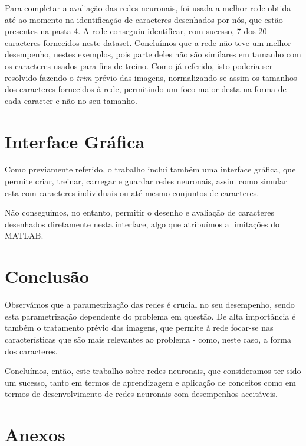 \documentclass[11pt]{article}
\begin{document}
	Para completar a avaliação das redes neuronais, foi usada a melhor rede obtida até ao momento na identificação de caracteres desenhados por nós, que estão presentes na pasta 4. A rede conseguiu identificar, com sucesso, 7 dos 20 caracteres fornecidos neste dataset. Concluímos que a rede não teve um melhor desempenho, nestes exemplos, pois parte deles não são similares em tamanho com os caracteres usados para fins de treino. Como já referido, isto poderia ser resolvido fazendo o \textit{trim} prévio das imagens, normalizando-se assim os tamanhos dos caracteres fornecidos à rede, permitindo um foco maior desta na forma de cada caracter e não no seu tamanho.
	
	\large
	\section{Interface Gráfica}
	\normalsize
	
	Como previamente referido, o trabalho inclui também uma interface gráfica, que permite criar, treinar, carregar e guardar redes neuronais, assim como simular esta com caracteres individuais ou até mesmo conjuntos de caracteres.
	
	Não conseguimos, no entanto, permitir o desenho e avaliação de caracteres desenhados diretamente nesta interface, algo que atribuímos a limitações do MATLAB.
	
	\large
	\section{Conclusão}
	\normalsize
	
	Observámos que a parametrização das redes é crucial no seu desempenho, sendo esta parametrização dependente do problema em questão. De alta importância é também o tratamento prévio das imagens, que permite à rede focar-se nas características que são mais relevantes ao problema - como, neste caso, a forma dos caracteres.
	
	Concluímos, então, este trabalho sobre redes neuronais, que consideramos ter sido um sucesso, tanto em termos de aprendizagem e aplicação de conceitos como em termos de desenvolvimento de redes neuronais com desempenhos aceitáveis.
	
	
	\large
	\section{Anexos}

	\normalsize
	\listoffigures
\end{document}
